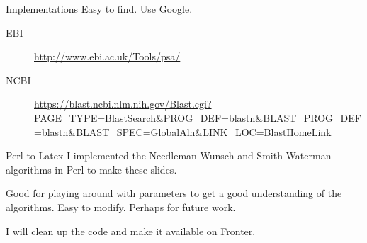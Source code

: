 \documentclass[pdf]{beamer}
\begin{document}
\begin{frame}{Implementations}
  Easy to find. Use Google.
  \begin{description}
  \item[EBI] \url{http://www.ebi.ac.uk/Tools/psa/}
  \item[NCBI]
    \url{https://blast.ncbi.nlm.nih.gov/Blast.cgi?PAGE_TYPE=BlastSearch\&PROG_DEF=blastn\&BLAST_PROG_DEF=blastn\&BLAST_SPEC=GlobalAln&LINK_LOC=BlastHomeLink}
  \end{description}
\end{frame}

\begin{frame}{Perl to Latex}
  I implemented the Needleman-Wunsch and Smith-Waterman algorithms in Perl to make
  these slides.

  Good for playing around with parameters to get a good understanding
  of the algorithms. Easy to modify. Perhaps for future work.

  I will clean up the code and make it available on Fronter.
\end{frame}
\end{document}
